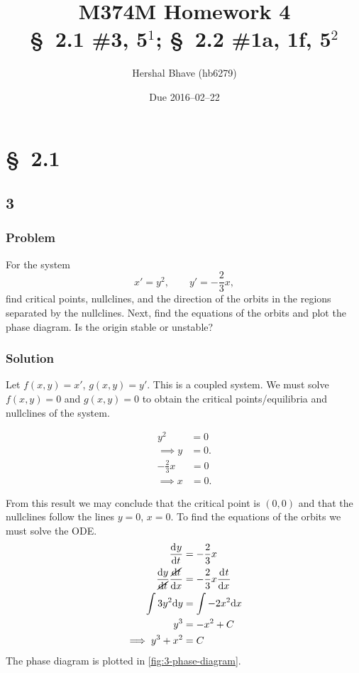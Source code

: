 \documentclass[12pt]{article}
\title{M374M Homework 4 \\
  \normalsize{\S~2.1 \#3, 5$^1$; \S~2.2 \#1a, 1f, 5$^2$}}
\author{Hershal Bhave (hb6279)}
\date{Due 2016--02--22}
\begin{document}
\maketitle
\section{\S~2.1}
\subsection{3}
\subsubsection*{Problem}
For the system
\begin{equation}
    x'=y^2, \qquad y'=-\frac{2}{3}x,
\end{equation}
find critical points, nullclines, and the direction of the orbits in the regions
separated by the nullclines. Next, find the equations of the orbits and plot the
phase diagram. Is the origin stable or unstable?
\subsubsection*{Solution}
Let $f(x,y) = x'$, $g(x,y) = y'$. This is a coupled system. We must solve
$f(x,y)=0$ and $g(x,y)=0$ to obtain the critical points/equilibria and
nullclines of the system.
\begin{multicols}{2}
  \begin{equation*}
    \begin{aligned}
      y^2 &= 0 \\
      \implies y &= 0.
    \end{aligned}
  \end{equation*}
  \begin{equation*}
    \begin{aligned}
      -\frac{2}{3}x &= 0 \\
      \implies x &= 0.
    \end{aligned}
  \end{equation*}
\end{multicols} \noindent
From this result we may conclude that the critical point is $(0,0)$ and that the
nullclines follow the lines $y=0$, $x=0$. To find the equations of the orbits we
must solve the ODE.
\begin{equation}
  \begin{aligned}
    \frac{\mathrm{d}^{} {y}}{\mathrm{d}{t}^{}} &= -\frac{2}{3}x \\
    \frac{\mathrm{d}{y}}{\cancel{\mathrm{d}{t}}} \frac{\cancel{\mathrm{d}{t}}}{\mathrm{d}{x}} &=
    -\frac{2}{3}x \frac{\mathrm{d}^{} {t}}{\mathrm{d}{x}^{}} \\
    \int 3y^2 \mathrm{d}{y} &= \int -2x^2 \mathrm{d}{x} \\
    y^3 &= -x^2 + C \\
    \implies y^3 + x^2 &= C
  \end{aligned}
\end{equation}
The phase diagram is plotted in \cref{fig:3-phase-diagram}.
\end{document}
